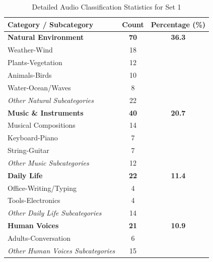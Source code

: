 \begin{table}[h!]
    \centering
    \caption{Detailed Audio Classification Statistics for Set 1}
    \label{tab:audio_stats_set1}
    \begin{tabularx}{\linewidth}{l S[table-format=2.0] S[table-format=2.1]}
        \toprule
        \textbf{Category / Subcategory} & \textbf{Count} & {\textbf{Percentage (\%)}} \\
        \midrule
        
        \textbf{Natural Environment} & \textbf{70} & \textbf{36.3} \\
        \quad Weather-Wind & 18 & {} \\
        \quad Plants-Vegetation & 12 & {} \\
        \quad Animals-Birds & 10 & {} \\
        \quad Water-Ocean/Waves & 8 & {} \\
        \quad \textit{Other Natural Subcategories} & 22 & {} \\ %
        
        \addlinespace %
        
        \textbf{Music \& Instruments} & \textbf{40} & \textbf{20.7} \\
        \quad Musical Compositions & 14 & {} \\
        \quad Keyboard-Piano & 7 & {} \\
        \quad String-Guitar & 7 & {} \\
        \quad \textit{Other Music Subcategories} & 12 & {} \\
        
        \addlinespace
        
        \textbf{Daily Life} & \textbf{22} & \textbf{11.4} \\
        \quad Office-Writing/Typing & 4 & {} \\
        \quad Tools-Electronics & 4 & {} \\
        \quad \textit{Other Daily Life Subcategories} & 14 & {} \\
        
        \addlinespace
        
        \textbf{Human Voices} & \textbf{21} & \textbf{10.9} \\
        \quad Adults-Conversation & 6 & {} \\
        \quad \textit{Other Human Voices Subcategories} & 15 & {} \\
        

\end{tabularx}
\end{table}
